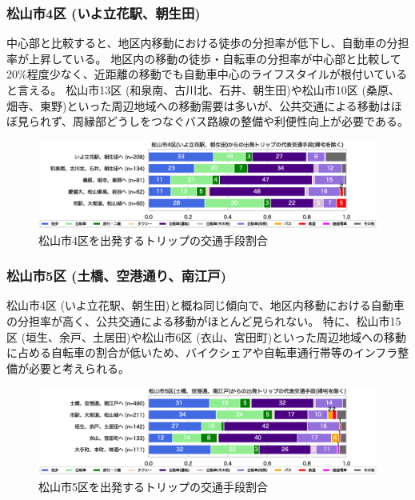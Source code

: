 \documentclass[a4paper,12pt, uplatex]{jsbook}
\begin{document}
\subsubsection{松山市4区 (いよ立花駅、朝生田)}
中心部と比較すると、地区内移動における徒歩の分担率が低下し、自動車の分担率が上昇している。
地区内の移動の徒歩・自転車の分担率が中心部と比較して20\%程度少なく、近距離の移動でも自動車中心のライフスタイルが根付いていると言える。
松山市13区 (和泉南、古川北、石井、朝生田)や松山市10区 (桑原、畑寺、東野)といった周辺地域への移動需要は多いが、公共交通による移動はほぼ見られず、周縁部どうしをつなぐバス路線の整備や利便性向上が必要である。
%
\begin{figure}[H]
    \centering
    \includegraphics[width=1.0\textwidth]{picture/mode_share_松山市4区.eps}
    \caption{松山市4区を出発するトリップの交通手段割合}
    \label{fig:mode_share_4}
\end{figure}

\subsubsection{松山市5区 (土橋、空港通り、南江戸)}
松山市4区 (いよ立花駅、朝生田)と概ね同じ傾向で、地区内移動における自動車の分担率が高く、公共交通による移動がほとんど見られない。
特に、松山市15区 (垣生、余戸、土居田)や松山市6区 (衣山、宮田町)といった周辺地域への移動に占める自転車の割合が低いため、バイクシェアや自転車通行帯等のインフラ整備が必要と考えられる。
%
\begin{figure}[H]
    \centering
    \includegraphics[width=1.0\textwidth]{picture/mode_share_松山市5区.eps}
    \caption{松山市5区を出発するトリップの交通手段割合}
    \label{fig:mode_share_5}
\end{figure}
\end{document}
